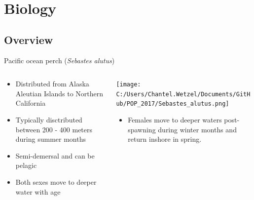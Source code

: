 \documentclass[pdf]{beamer}\usepackage[]{graphicx}\usepackage[]{color}
\begin{document}
\section{Biology}

\subsection{Overview}
\begin{frame}{Pacific ocean perch (\textit{Sebastes alutus})}
\begin{columns}
  \begin{column}{0.5\textwidth}
      \begin{itemize}
        \item Distributed from  Alaska Aleutian Islands to Northern California
        \item Typically disctributed between 200 - 400 meters during summer months
        \item Semi-demersal and can be pelagic
        \item Both sexes move to deeper water with age
      \end{itemize}
  \end{column}
  
  \begin{column}{0.5\textwidth}
    \texttt{[image: C:/Users/Chantel.Wetzel/Documents/GitHub/POP\_2017/Sebastes\_alutus.png]}
    \begin{itemize}
        \item Females move to deeper waters post-spawning during winter months and return inshore in spring.
      \end{itemize}
  \end{column}
\end{columns}
\end{frame}
\end{document}
